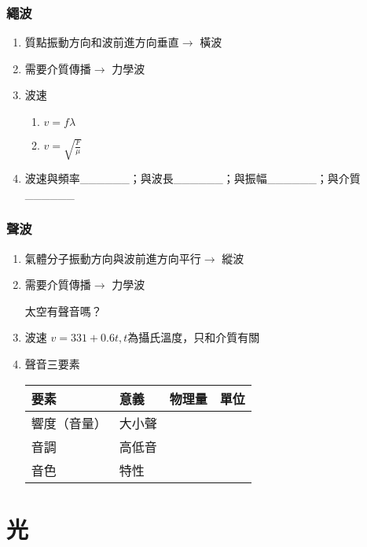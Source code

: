 \documentclass[cn,10pt,math=newtx,chinesefont=founder]{elegantbook}
\begin{document}
\subsection{繩波}
\begin{enumerate}
    \item 質點振動方向和波前進方向垂直$\longrightarrow$ 橫波
    \item 需要介質傳播$\longrightarrow$ 力學波
    \item 波速
    \begin{enumerate}
        \item $v=f\lambda$
        \item $v=\sqrt{\frac{F}{\mu}}$\\
    \end{enumerate}
    \item 波速與頻率\_\_\_\_\_\_；與波長\_\_\_\_\_\_；與振幅\_\_\_\_\_\_；與介質\_\_\_\_\_\_
\end{enumerate}

\subsection{聲波}
\begin{enumerate}
    \item 氣體分子振動方向與波前進方向平行$\longrightarrow$ 縱波
    \item 需要介質傳播$\longrightarrow$ 力學波
    \begin{note}{太空有聲音嗎？}
        
    \end{note}
    \item 波速 $v=331+0.6t, t$為攝氏溫度，只和介質有關
    \item 聲音三要素
    \begin{table}[htbp]

  
      \begin{tabular}{llll}
      \toprule
      要素 & 意義 & 物理量 & 單位 \\
      \midrule
      響度（音量） & 大小聲 &    &  \\
      音調 & 高低音 &    &  \\
      音色 & 特性 &    &   \\

      \bottomrule
      \end{tabular}%

    \end{table}%
\end{enumerate}



\chapter{光}
\end{document}
